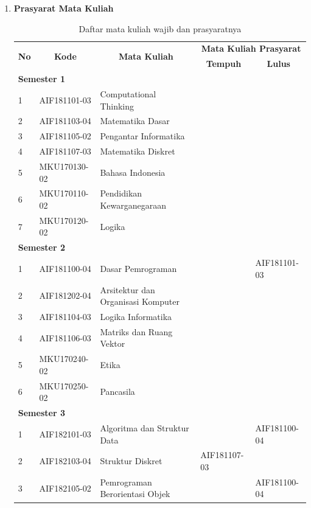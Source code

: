 \documentclass[a4paper,twoside]{article}
\begin{document}
\begin{enumerate}
\begin{enumerate}
			\item \textbf{Prasyarat Mata Kuliah} \\
				\begin{table}[H]
				\centering
		\caption{Daftar mata kuliah wajib dan prasyaratnya}
		\begin{tabular}{|p{0.5cm}|p{2.85cm}|p{4.95cm}|p{2.7cm}|p{2.7cm}|}
			\hline
			\multicolumn{1}{|c|}{\multirow{2}{*}{\textbf{No}}} & \multicolumn{1}{c|}{\multirow{2}{*}{\textbf{Kode}}} & \multicolumn{1}{c|}{\multirow{2}{*}{\textbf{Mata Kuliah}}} & \multicolumn{2}{c|}{\textbf{Mata Kuliah Prasyarat}} \\ \cline{4-5}
			 &  &  & \multicolumn{1}{c|}{\textbf{Tempuh}} & \multicolumn{1}{c|}{\textbf{Lulus}} \\ \hline
			\multicolumn{5}{|l|}{\textbf{Semester 1}} \\ \hline
1 & AIF181101-03 & Computational Thinking &  &  \\ \hline
2 & AIF181103-04 & Matematika Dasar &  &  \\ \hline
3 & AIF181105-02 & Pengantar Informatika &  &  \\ \hline
4 & AIF181107-03 & Matematika Diskret &  &  \\ \hline
5 & MKU170130-02 & Bahasa Indonesia &  &  \\ \hline
6 & MKU170110-02 & Pendidikan Kewarganegaraan &  &  \\ \hline
7 & MKU170120-02 & Logika &  &  \\ \hline
\multicolumn{5}{|l|}{\textbf{Semester 2}} \\ \hline
1 & AIF181100-04 & Dasar Pemrograman &  & AIF181101-03 \\ \hline
2 & AIF181202-04 & Arsitektur dan Organisasi Komputer &  &  \\ \hline
3 & AIF181104-03 & Logika Informatika &  &  \\ \hline
4 & AIF181106-03 & Matriks dan Ruang Vektor &  &  \\ \hline
5 & MKU170240-02 & Etika &  &  \\ \hline
6 & MKU170250-02 & Pancasila &  &  \\ \hline
\multicolumn{5}{|l|}{\textbf{Semester 3}} \\ \hline
1 & AIF182101-03 & Algoritma dan Struktur Data &  & AIF181100-04 \\ \hline
2 & AIF182103-04 & Struktur Diskret & AIF181107-03 &  \\ \hline
3 & AIF182105-02 & Pemrograman Berorientasi Objek &  & AIF181100-04 \\ \hline

\end{tabular}
\end{table}
\end{enumerate}
\end{enumerate}
\end{document}
